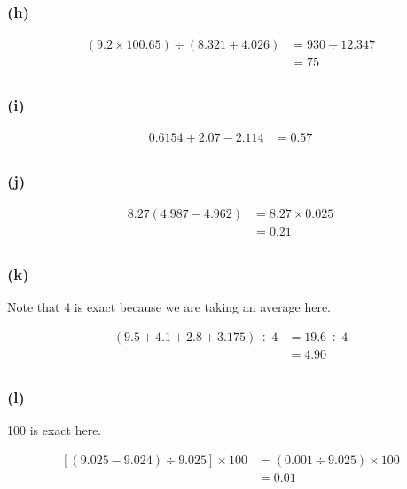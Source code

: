 \documentclass[11pt]{scrartcl}
\begin{document}
\subsubsection{(h)}

\begin{align*}
    \left (9.2 \times 100.65 \right) \div \left (8.321 + 4.026 \right) &= 930 \div 12.347 \\
    &= \boxed{75} \\
\end{align*}

\subsubsection{(i)}

\begin{align*}
    0.6154 + 2.07 - 2.114 &= \boxed{0.57} \\
\end{align*}

\subsubsection{(j)}

\begin{align*}
    8.27 \left (4.987 - 4.962 \right) &= 8.27 \times 0.025 \\
    &= \boxed{0.21} \\
\end{align*}

\subsubsection{(k)}

Note that $4$ is exact because we are taking an average here.

\begin{align*}
    \left (9.5 + 4.1 + 2.8 + 3.175 \right) \div 4 &= 19.6 \div 4 \\
    &= \boxed{4.90} \\
\end{align*}

\subsubsection{(l)}
100 is exact here.

\begin{align*}
    \left [ \left (9.025 - 9.024 \right) \div 9.025 \right] \times 100 &= \left (0.001 \div 9.025 \right) \times 100 \\
    &= \boxed{0.01} \\
\end{align*}
\end{document}
